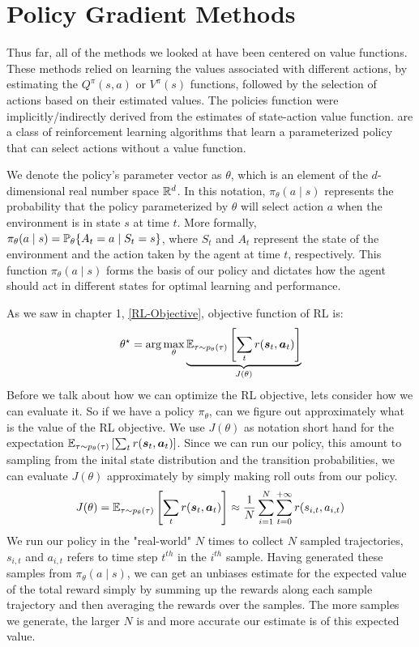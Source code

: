 \section{Policy Gradient Methods}
Thus far, all of the methods we looked at have been centered on value functions. These methods relied on learning the values associated with different actions, by estimating the $Q^{\pi}(s,a)$ or $V^{\pi}(s)$ functions, followed by the selection of actions based on their estimated values. The policies function were implicitly/indirectly derived from the estimates of state-action value function. 
 are a class of reinforcement learning algorithms that learn a parameterized policy that can select actions without a value function. 

We denote the policy's parameter vector as $\theta$, which is an element of the $d$-dimensional real number space $\mathbb R^d$. In this notation, $\pi_{\theta}(a \mid s)$ represents the probability that the policy parameterized by $\theta$ will select action $a$ when the environment is in state $s$ at time $t$. More formally, $\pi_{\theta}(a \mid s) = \mathbb P_{\theta} \{A_t = a \mid S_t = s \}$, where $S_t$ and $A_t$ represent the state of the environment and the action taken by the agent at time $t$, respectively. This function $\pi_{\theta}(a \mid s)$ forms the basis of our policy and dictates how the agent should act in different states for optimal learning and performance.

As we saw in chapter 1, \ref{RL-Objective}, objective function of RL is:
\begin{align*}\label{RL-Objective}
    \theta^{\star} = \arg \max_{\theta} \underbrace{\mathbb E_{\tau \sim p_{\theta}(\tau)} \left[ 
    \sum_{t} r(\boldsymbol{s}_t, \boldsymbol{a}_t)
    \right]}_{J(\theta)}
\end{align*}
Before we talk about how we can optimize the RL objective, lets consider how we can evaluate it. So if we have a policy $\pi_{\theta}$, can we figure out approximately what is the value of the RL objective. We use $J(\theta)$ as notation short hand for the expectation 
$\mathbb E_{\tau \sim p_{\theta}(\tau)} \left[  \sum_{t} r(\boldsymbol{s}_t, \boldsymbol{a}_t) \right]$. 
Since we can run our policy, this amount to sampling from the inital state distribution and the transition probabilities, we can evaluate $J(\theta)$ approximately by simply making roll outs from our policy. 
\begin{align}
    J(\theta) = \mathbb E_{\tau \sim p_{\theta}(\tau)} \left[ 
    \sum_{t} r(\boldsymbol{s}_t, \boldsymbol{a}_t)
    \right] \approx \frac{1}{N} \sum_{i = 1}^{N} \sum_{t=0}^{+ \infty} r(s_{i,t}, a_{i,t})
\end{align}
We run our policy in the "real-world" $N$ times to collect $N$ sampled trajectories, $s_{i,t}$ and $a_{i,t}$ refers to time step $t^{th}$ in the $i^{th}$ sample. Having generated these samples from $\pi_{\theta}(a \mid s)$, we can get an unbiases estimate for the expected value of the total reward simply by summing up the rewards along each sample trajectory and then averaging the rewards over the samples. The more samples we generate, the larger $N$ is and more accurate our estimate is of this expected value. 




